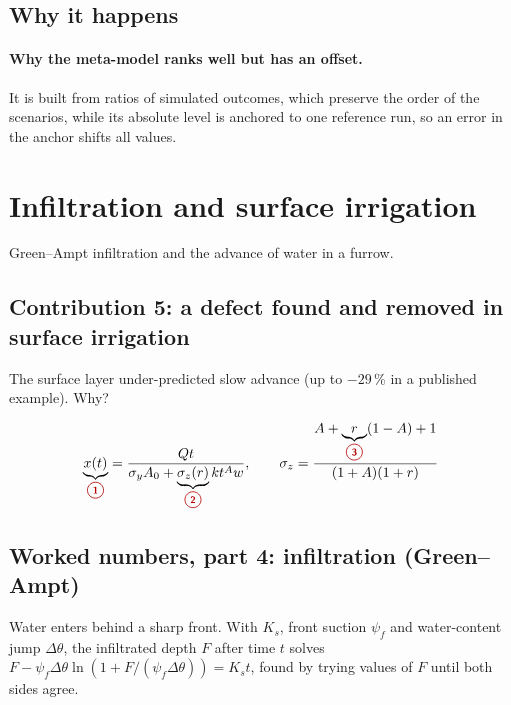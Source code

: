 \subsection{Why it happens}
\paragraph{Why the meta-model ranks well but has an offset.} It is built from ratios of simulated outcomes, which preserve the order of the scenarios, while its absolute level is anchored to one reference run, so an error in the anchor shifts all values.

\section{Infiltration and surface irrigation}
Green--Ampt infiltration and the advance of water in a furrow.

\subsection{Contribution 5: a defect found and removed in surface irrigation}\label{con:s2:5}
\begin{problem}
The surface layer under-predicted slow advance (up to $-29\,\%$ in a published example). Why?
\end{problem}
\begin{keyresult}
\[\underbrace{x(t)}_{\circled{1}}=\frac{Qt}{\sigma_yA_0+\underbrace{\sigma_z(r)}_{\circled{2}}kt^Aw},\qquad \sigma_z=\frac{A+\underbrace{r}_{\circled{3}}(1-A)+1}{(1+A)(1+r)}\]
\end{keyresult}
\begin{pins}
\end{pins}

\subsection{Worked numbers, part 4: infiltration (Green--Ampt)}
Water enters behind a sharp front. With $K_s$, front suction $\psi_f$ and water-content jump $\Delta\theta$, the infiltrated depth $F$ after time $t$ solves $F-\psi_f\Delta\theta\ln(1+F/(\psi_f\Delta\theta))=K_st$, found by trying values of $F$ until both sides agree.


